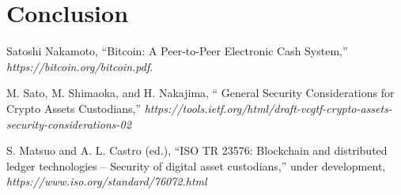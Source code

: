 \documentclass[english]{llncs}
\begin{document}
\section{Conclusion}

\begin{thebibliography}{21}
 Satoshi Nakamoto, ``Bitcoin: A Peer-to-Peer Electronic Cash System,'' \textit{https://bitcoin.org/bitcoin.pdf}.

M. Sato, M. Shimaoka, and H. Nakajima, ``  General Security Considerations for Crypto Assets Custodians,''
 \textit{https://tools.ietf.org/html/draft-vcgtf-crypto-assets-security-considerations-02}

S. Matsuo and A. L. Castro (ed.), ``ISO TR 23576: Blockchain and distributed ledger technologies -- Security of digital asset custodians,''  under development,
\textit{https://www.iso.org/standard/76072.html}


\end{thebibliography}
\end{document}
